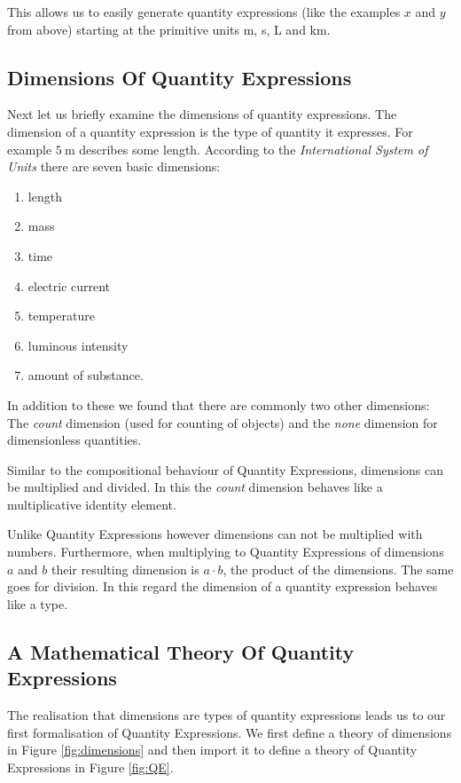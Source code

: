 This allows us to easily generate quantity expressions (like the examples $x$ and $y$ from above) starting at the primitive units m, s, L and km.

\subsection{Dimensions Of Quantity Expressions}
Next let us briefly examine the dimensions of quantity expressions. The dimension of a quantity expression is the type of quantity it expresses. For example $5\ \text{m}$ describes some length. According to the \textit{International System of Units} \cite{sispec} there are seven basic dimensions:
\begin{enumerate}
  \item length
  \item mass
  \item time
  \item electric current
  \item temperature
  \item luminous intensity
  \item amount of substance.
\end{enumerate}

In addition to these we found that there are commonly two other dimensions: The \textit{count} dimension (used for counting of objects) and the \textit{none} dimension for dimensionless quantities.

Similar to the compositional behaviour of Quantity Expressions, dimensions can be multiplied and divided. In this the \textit{count} dimension behaves like a multiplicative identity element.

Unlike Quantity Expressions however dimensions can not be multiplied with numbers. Furthermore, when multiplying to Quantity Expressions of dimensions $a$ and $b$ their resulting dimension is $a \cdot{} b$, the product of the dimensions. The same goes for division. In this regard the dimension of a quantity expression behaves like a type.

\subsection{A Mathematical Theory Of Quantity Expressions}
\label{sec:qeform}

The realisation that dimensions are types of quantity expressions leads us to our first formalisation of Quantity Expressions. We first define a theory of dimensions in Figure \ref{fig:dimensions} and then import it to define a theory of Quantity Expressions in Figure \ref{fig:QE}.

